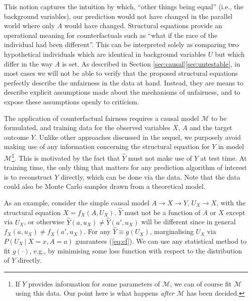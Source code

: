 \documentclass{article}
\begin{document}
This notion captures the intuition by which, ``other things being equal''
(i.e., the background variables), our prediction would not have changed in the
parallel world where only $A$ would have changed.  Structural equations provide an operational meaning for counterfactuals
such as ``what if the race of the individual had been different''.
This can be interpreted solely as comparing two hypothetical individuals which are
identical in background variables $U$ but which differ in the way $A$ is set.
As described in Section \ref{sec:causal}\ref{sec:untestable}, in most cases we will not be able to verify that the proposed structural equations perfectly describe the unfairness in the data at hand.  
Instead, they are means to describe explicit assumptions made about the mechanisms of unfairness, and to expose these assumptions openly to criticism.

The application of counterfactual fairness requires a causal model
$\mathcal M$ to be formulated, and training data for the observed
variables $X$, $A$ and the target outcome $Y$. Unlike other approaches
discussed in the sequel, we purposely avoid making use of any
information concerning the structural equation for $Y$ in model
$\mathcal M$\footnote{If $Y$ provides information for some parameters
  of $\mathcal M$, we can of course fit $\mathcal M$ using this
  data. Our point here is what happens \emph{after} $\mathcal M$ has
  been decided.}. This is motivated by the fact that $\hat Y$ must not
make use of $Y$ at test time. At training time, the only thing that
matters for any prediction algorithm of interest is to reconstruct $Y$
directly, which can be done via the data. Note that the data could
also be Monte Carlo samples drawn from a theoretical model.

As an example, consider the simple causal model $A \rightarrow X \rightarrow
Y$, $U_X \rightarrow X$,  with the structural equation $X = f_X(A, U_X)$. $\hat Y$ must not
be a function of $A$ or $X$ except via $U_X$, or otherwise $\hat Y(a,
u_X) \neq \hat Y(a', u_X)$ will be different since in general $f_X(a,
u_X) \neq f_X(a', u_X)$. For any $\hat Y \equiv g(U_X)$, marginalising
$U_X$ via $P(U_X\ |\ X = x, A = a)$ guarantees (\ref{eq:cf}). We can use any statistical method to fit $g(\cdot)$, e.g., 
by minimising some loss function with respect to the distribution of $Y$ directly.
\end{document}
